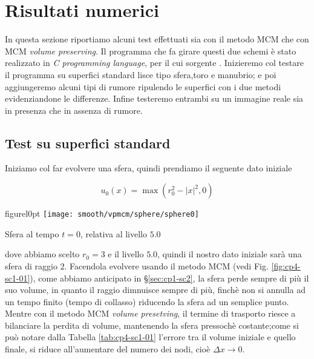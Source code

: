%
\chapter{Risultati numerici}
\label{cap:cp4}

In questa sezione riportiamo alcuni test effettuati sia con il metodo
MCM che con MCM \emph{volume preserving}. Il programma che fa girare
questi due schemi è stato realizzato in \emph{C programming language},
per il cui sorgente \cite[vedi][]{vpmcm:code}. Inizieremo col testare
il programma su superfici standard lisce tipo sfera,toro e manubrio; e
poi aggiungeremo alcuni tipi di rumore ripulendo le superfici con i
due metodi evidenziandone le differenze. Infine testeremo entrambi su
un immagine reale sia in presenza che in assenza di rumore.

%
\section{Test su superfici standard}
\label{sec:cp4-sc1}
Iniziamo col far evolvere una sfera, quindi prendiamo il seguente dato
iniziale

\[
u_0(x) = \max\left(r_0^2-|x|^2,0\right)
\]


\begin{wrapfloat}{figure}{l}{0pt}
\texttt{[image: smooth/vpmcm/sphere/sphere0]}
\caption{Sfera al tempo $t=0$, relativa al livello $5.0$}
\end{wrapfloat}

dove abbiamo scelto $r_0=3$ e il livello $5.0$, quindi il nostro dato
iniziale sarà una sfera di raggio $2$. Facendola evolvere usando il  metodo
MCM (vedi Fig. \ref{fig:cp4-sc1-01}), come abbiamo anticipato
in §\ref{sec:cp1-sc2}, la sfera perde sempre di più il suo volume, in
quanto il raggio dimnuisce sempre di più, finchè non si annulla ad un
tempo finito (tempo di collasso) riducendo la sfera ad un semplice punto. Mentre
con il metodo MCM \emph{volume presetving}, il termine di trasporto
riesce a bilanciare la perdita di volume, mantenendo la sfera pressochè
costante;come si può notare dalla Tabella \ref{tab:cp4-sc1-01}
 l'errore tra il volume iniziale e quello finale, si riduce
 all'aumentare del numero dei nodi, cioè $\Delta x\to 0$.

